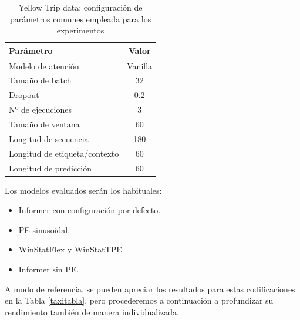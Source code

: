 \begin{table}[!ht]
	\centering
	\begin{tabular}{l|c}
		\toprule
		Parámetro & Valor \\
		\midrule
		{Modelo de atención} & Vanilla \\
		{Tamaño de batch} & 32 \\
		{Dropout} & 0.2 \\
		{Nº de ejecuciones} & 3 \\
		{Tamaño de ventana} & 60 \\
		{Longitud de secuencia} & 180 \\
		{Longitud de etiqueta/contexto} & 60 \\
		{Longitud de predicción} & 60 \\
		\bottomrule
	\end{tabular}
	\caption{Yellow Trip data: configuración de parámetros comunes empleada para los experimentos}
	\label{ajustestaxi}
\end{table}

Los modelos evaluados serán los habituales: 

\begin{itemize}
	\item Informer con configuración por defecto.
	\item PE sinusoidal.
	\item WinStatFlex y WinStatTPE
	\item Informer sin PE.
\end{itemize}

A modo de referencia, se pueden apreciar los resultados para estas codificaciones en la Tabla \ref{taxitabla}, pero procederemos a continuación a profundizar su rendimiento también de manera individualizada.




